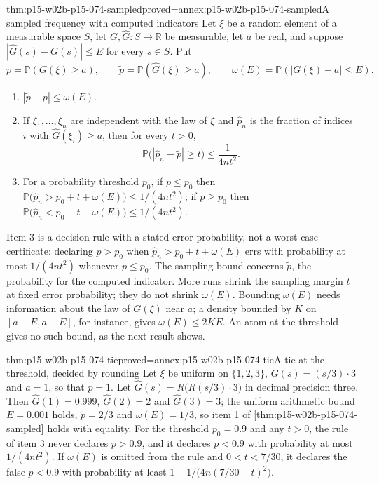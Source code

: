 \begin{hbtheorem}{thm:p15-w02b-p15-074-sampled}{proved=annex:p15-w02b-p15-074-sampled}{A sampled frequency with computed indicators}
Let \(\xi\) be a random element of a measurable space \(S\), let
\(G,\widehat G:S\to\mathbb R\) be measurable, let \(a\) be real, and
suppose \(|\widehat G(s)-G(s)|\leq E\) for every \(s\in S\). Put
\[
 p=\mathbb P(G(\xi)\geq a),\qquad
 \widetilde p=\mathbb P(\widehat G(\xi)\geq a),\qquad
 \omega(E)=\mathbb P(|G(\xi)-a|\leq E).
\]
\begin{enumerate}
\item \(|\widetilde p-p|\leq\omega(E)\).
\item If \(\xi_1,\ldots,\xi_n\) are independent with the law of \(\xi\)
and \(\widehat p_n\) is the fraction of indices \(i\) with
\(\widehat G(\xi_i)\geq a\), then for every \(t>0\),
\[
 \mathbb P\bigl(|\widehat p_n-\widetilde p|\geq t\bigr)\leq\frac1{4nt^2}.
\]
\item For a probability threshold \(p_0\), if \(p\leq p_0\) then
\(\mathbb P\bigl(\widehat p_n>p_0+t+\omega(E)\bigr)\leq1/(4nt^2)\);
if \(p\geq p_0\) then
\(\mathbb P\bigl(\widehat p_n<p_0-t-\omega(E)\bigr)\leq1/(4nt^2)\).
\end{enumerate}
\end{hbtheorem}

Item 3 is a decision rule with a stated error probability, not a
worst-case certificate: declaring \(p>p_0\) when
\(\widehat p_n>p_0+t+\omega(E)\) errs with probability at most
\(1/(4nt^2)\) whenever \(p\leq p_0\). The sampling bound concerns
\(\widetilde p\), the probability for the computed indicator. More runs
shrink the sampling margin \(t\) at fixed error probability; they do
not shrink \(\omega(E)\). Bounding \(\omega(E)\) needs information about
the law of \(G(\xi)\) near \(a\); a density bounded by \(K\) on
\([a-E,a+E]\), for instance, gives \(\omega(E)\leq2KE\). An atom at the
threshold gives no such bound, as the next result shows.

\begin{hbtheorem}{thm:p15-w02b-p15-074-tie}{proved=annex:p15-w02b-p15-074-tie}{A tie at the threshold, decided by rounding}
Let \(\xi\) be uniform on \(\{1,2,3\}\), \(G(s)=(s/3)\cdot3\) and
\(a=1\), so that \(p=1\). Let \(\widehat G(s)=R\bigl(R(s/3)\cdot3\bigr)\)
in decimal precision three. Then \(\widehat G(1)=0.999\),
\(\widehat G(2)=2\) and \(\widehat G(3)=3\); the uniform arithmetic
bound \(E=0.001\) holds, \(\widetilde p=2/3\) and \(\omega(E)=1/3\),
so item 1 of \cref{thm:p15-w02b-p15-074-sampled} holds with equality.
For the threshold \(p_0=0.9\) and any \(t>0\), the rule of item 3
never declares \(p>0.9\), and it declares \(p<0.9\) with probability at
most \(1/(4nt^2)\). If \(\omega(E)\) is omitted from the rule and
\(0<t<7/30\), it declares the false \(p<0.9\) with probability at least
\(1-1/\bigl(4n(7/30-t)^2\bigr)\).
\end{hbtheorem}

